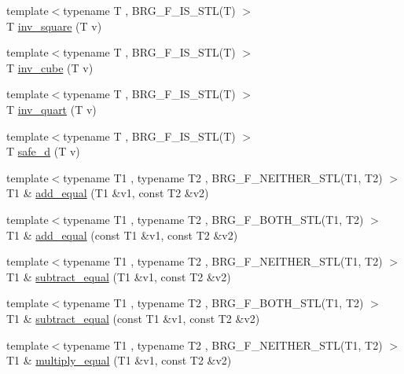 \begin{DoxyCompactItemize}
\item 
{\footnotesize template$<$typename T , B\-R\-G\-\_\-\-F\-\_\-\-I\-S\-\_\-\-S\-T\-L(\-T) $>$ }\\T \hyperlink{namespaceIceBRG_a49bbe2d1cefc03dfb98f65daa1ebf19b}{inv\-\_\-square} (T v)
\item 
{\footnotesize template$<$typename T , B\-R\-G\-\_\-\-F\-\_\-\-I\-S\-\_\-\-S\-T\-L(\-T) $>$ }\\T \hyperlink{namespaceIceBRG_a6ffc82b0f391872a4a42bfa5a2fdb843}{inv\-\_\-cube} (T v)
\item 
{\footnotesize template$<$typename T , B\-R\-G\-\_\-\-F\-\_\-\-I\-S\-\_\-\-S\-T\-L(\-T) $>$ }\\T \hyperlink{namespaceIceBRG_aa9817804e41ecd000dfbd83394b93d27}{inv\-\_\-quart} (T v)
\item 
{\footnotesize template$<$typename T , B\-R\-G\-\_\-\-F\-\_\-\-I\-S\-\_\-\-S\-T\-L(\-T) $>$ }\\T \hyperlink{namespaceIceBRG_a9a89fcacc3ccd94858bbacb8136e0c4a}{safe\-\_\-d} (T v)
\item 
{\footnotesize template$<$typename T1 , typename T2 , B\-R\-G\-\_\-\-F\-\_\-\-N\-E\-I\-T\-H\-E\-R\-\_\-\-S\-T\-L(\-T1, T2) $>$ }\\T1 \& \hyperlink{namespaceIceBRG_ab21dd9318b49555455e55da08556189c}{add\-\_\-equal} (T1 \&v1, const T2 \&v2)
\item 
{\footnotesize template$<$typename T1 , typename T2 , B\-R\-G\-\_\-\-F\-\_\-\-B\-O\-T\-H\-\_\-\-S\-T\-L(\-T1, T2) $>$ }\\T1 \& \hyperlink{namespaceIceBRG_a95be95920f4fb62f65b451929aba41e2}{add\-\_\-equal} (const T1 \&v1, const T2 \&v2)
\item 
{\footnotesize template$<$typename T1 , typename T2 , B\-R\-G\-\_\-\-F\-\_\-\-N\-E\-I\-T\-H\-E\-R\-\_\-\-S\-T\-L(\-T1, T2) $>$ }\\T1 \& \hyperlink{namespaceIceBRG_aa2b7769fa098ff13b1726b741321ffe9}{subtract\-\_\-equal} (T1 \&v1, const T2 \&v2)
\item 
{\footnotesize template$<$typename T1 , typename T2 , B\-R\-G\-\_\-\-F\-\_\-\-B\-O\-T\-H\-\_\-\-S\-T\-L(\-T1, T2) $>$ }\\T1 \& \hyperlink{namespaceIceBRG_a9a5378e1a8aa51111c3e838a12fc119a}{subtract\-\_\-equal} (const T1 \&v1, const T2 \&v2)
\item 
{\footnotesize template$<$typename T1 , typename T2 , B\-R\-G\-\_\-\-F\-\_\-\-N\-E\-I\-T\-H\-E\-R\-\_\-\-S\-T\-L(\-T1, T2) $>$ }\\T1 \& \hyperlink{namespaceIceBRG_a94f7d3a6e835b43a374e8f0f6f3b89ea}{multiply\-\_\-equal} (T1 \&v1, const T2 \&v2)

\end{DoxyCompactItemize}
